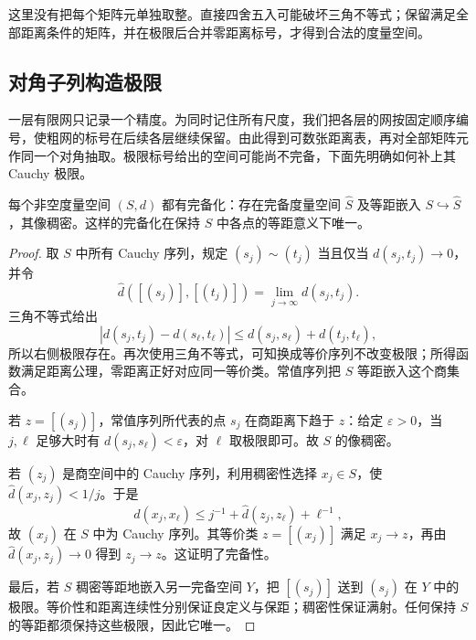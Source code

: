 这里没有把每个矩阵元单独取整。直接四舍五入可能破坏三角不等式；保留满足全部距离条件的矩阵，并在极限后合并零距离标号，才得到合法的度量空间。

\subsection{对角子列构造极限}
\label{g3:subsec:1003:02}

一层有限网只记录一个精度。为同时记住所有尺度，我们把各层的网按固定顺序编号，使粗网的标号在后续各层继续保留。由此得到可数张距离表，再对全部矩阵元作同一个对角抽取。极限标号给出的空间可能尚不完备，下面先明确如何补上其 Cauchy 极限。

\begin{lemma}\label{g3:lem:metric-completion}
	每个非空度量空间 \((S,d)\) 都有完备化：存在完备度量空间 \(\widehat S\) 及等距嵌入 \(S\hookrightarrow\widehat S\)，其像稠密。这样的完备化在保持 \(S\) 中各点的等距意义下唯一。
\end{lemma}
\begin{proof}
	取 \(S\) 中所有 Cauchy 序列，规定 \((s_j)\sim(t_j)\) 当且仅当 \(d(s_j,t_j)\to0\)，并令
	\[
		\widehat d([(s_j)],[(t_j)])=\lim_{j\to\infty}d(s_j,t_j).
	\]
	三角不等式给出
	\[
		|d(s_j,t_j)-d(s_\ell,t_\ell)|
		\le d(s_j,s_\ell)+d(t_j,t_\ell),
	\]
	所以右侧极限存在。再次使用三角不等式，可知换成等价序列不改变极限；所得函数满足距离公理，零距离正好对应同一等价类。常值序列把 \(S\) 等距嵌入这个商集合。

	若 \(z=[(s_j)]\)，常值序列所代表的点 \(s_j\) 在商距离下趋于 \(z\)：给定 \(\varepsilon>0\)，当 \(j,\ell\) 足够大时有 \(d(s_j,s_\ell)<\varepsilon\)，对 \(\ell\) 取极限即可。故 \(S\) 的像稠密。

	若 \((z_j)\) 是商空间中的 Cauchy 序列，利用稠密性选择 \(x_j\in S\)，使 \(\widehat d(x_j,z_j)<1/j\)。于是
	\[
		d(x_j,x_\ell)
		\le j^{-1}+\widehat d(z_j,z_\ell)+\ell^{-1},
	\]
	故 \((x_j)\) 在 \(S\) 中为 Cauchy 序列。其等价类 \(z=[(x_j)]\) 满足 \(x_j\to z\)，再由 \(\widehat d(x_j,z_j)\to0\) 得到 \(z_j\to z\)。这证明了完备性。

	最后，若 \(S\) 稠密等距地嵌入另一完备空间 \(Y\)，把 \([(s_j)]\) 送到 \((s_j)\) 在 \(Y\) 中的极限。等价性和距离连续性分别保证良定义与保距；稠密性保证满射。任何保持 \(S\) 的等距都须保持这些极限，因此它唯一。
\end{proof}

